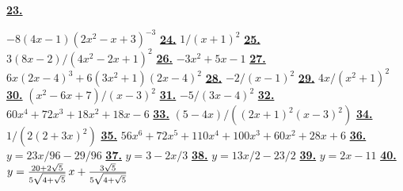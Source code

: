 \hypertarget {a:6.1.23}{\hyperlink {e:6.1.23}{\bfseries 23.}} \mdseries $-8(4x-1)(2x^2-x+3)^{-3}$\qquad 
\hypertarget {a:6.1.24}{\hyperlink {e:6.1.24}{\bfseries 24.}} \mdseries $1/(x+1)^2$\qquad 
\hypertarget {a:6.1.25}{\hyperlink {e:6.1.25}{\bfseries 25.}} \mdseries $3(8x-2)/(4x^2-2x+1)^2$\qquad 
\hypertarget {a:6.1.26}{\hyperlink {e:6.1.26}{\bfseries 26.}} \mdseries $-3x^2+5x-1$\qquad 
\hypertarget {a:6.1.27}{\hyperlink {e:6.1.27}{\bfseries 27.}} \mdseries $6x(2x-4)^3+6(3x^2+1)(2x-4)^2$\qquad 
\hypertarget {a:6.1.28}{\hyperlink {e:6.1.28}{\bfseries 28.}} \mdseries $-2/(x-1)^2$\qquad 
\hypertarget {a:6.1.29}{\hyperlink {e:6.1.29}{\bfseries 29.}} \mdseries $4x/(x^2+1)^2$\qquad 
\hypertarget {a:6.1.30}{\hyperlink {e:6.1.30}{\bfseries 30.}} \mdseries $(x^2-6x+7)/(x-3)^2$\qquad 
\hypertarget {a:6.1.31}{\hyperlink {e:6.1.31}{\bfseries 31.}} \mdseries $-5/(3x-4)^2$\qquad 
\hypertarget {a:6.1.32}{\hyperlink {e:6.1.32}{\bfseries 32.}} \mdseries $60x^4+72x^3+18x^2+18x-6$\qquad 
\hypertarget {a:6.1.33}{\hyperlink {e:6.1.33}{\bfseries 33.}} \mdseries $(5-4x)/((2x+1)^2(x-3)^2)$\qquad 
\hypertarget {a:6.1.34}{\hyperlink {e:6.1.34}{\bfseries 34.}} \mdseries $1/(2(2+3x)^2)$\qquad 
\hypertarget {a:6.1.35}{\hyperlink {e:6.1.35}{\bfseries 35.}} \mdseries $56x^6+72x^5+110x^4+100x^3+60x^2+28x+6$\qquad 
\hypertarget {a:6.1.36}{\hyperlink {e:6.1.36}{\bfseries 36.}} \mdseries $y=23x/96-29/96$\qquad 
\hypertarget {a:6.1.37}{\hyperlink {e:6.1.37}{\bfseries 37.}} \mdseries $y=3-2x/3$\qquad 
\hypertarget {a:6.1.38}{\hyperlink {e:6.1.38}{\bfseries 38.}} \mdseries $y=13x/2-23/2$\qquad 
\hypertarget {a:6.1.39}{\hyperlink {e:6.1.39}{\bfseries 39.}} \mdseries $y=2x-11$\qquad 
\hypertarget {a:6.1.40}{\hyperlink {e:6.1.40}{\bfseries 40.}} \mdseries $y= {20+2\sqrt 5\over 5\sqrt {4+\sqrt 5}}\,x+{3\sqrt 5\over 5\sqrt {4+\sqrt 5}}$\qquad 
